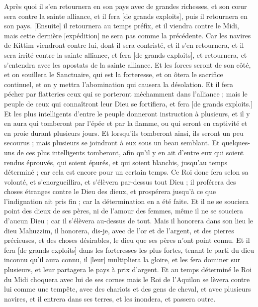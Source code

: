 \begin{multicols}{2}
Après quoi il s'en retournera en son pays avec de grandes richesses, et son cœur sera contre la sainte alliance, et il fera [de grands exploits], puis il retournera en son pays.
[Ensuite] il retournera au temps préfix, et il viendra contre le Midi, mais cette dernière [expédition] ne sera pas comme la précédente.
Car les navires de Kittim viendront contre lui, dont il sera contristé, et il s'en retournera, et il sera irrité contre la sainte alliance, et fera [de grands exploits], et retournera, et s'entendra avec les apostats de la sainte alliance.
Et les forces seront de son côté, et on souillera le Sanctuaire, qui est la forteresse, et on ôtera le sacrifice continuel, et on y mettra l'abomination qui causera la désolation.
Et il fera pécher par flatteries ceux qui se porteront méchamment dans l'alliance ; mais le peuple de ceux qui connaîtront leur Dieu se fortifiera, et fera [de grands exploits.]
Et les plus intelligents d'entre le peuple donneront instruction à plusieurs, et il y en aura qui tomberont par l'épée et par la flamme, ou qui seront en captivité et en proie durant plusieurs jours.
Et lorsqu'ils tomberont ainsi, ils seront un peu secourus ; mais plusieurs se joindront à eux sous un beau semblant.
Et quelques-uns de ces plus intelligents tomberont, afin qu'il y en ait d'entre eux qui soient rendus éprouvés, qui soient épurés, et qui soient blanchis, jusqu'au temps déterminé ; car cela est encore pour un certain temps.
Ce Roi donc fera selon sa volonté, et s'enorgueillira, et s'élèvera par-dessus tout Dieu ; il proférera des choses étranges contre le Dieu des dieux, et prospérera jusqu'à ce que l'indignation ait pris fin ; car la détermination en a été faite.
Et il ne se souciera point des dieux de ses pères, ni de l'amour des femmes, même il ne se souciera d'aucun Dieu ; car il s'élèvera au-dessus de tout.
Mais il honorera dans son lieu le dieu Mahuzzim, il honorera, dis-je, avec de l'or et de l'argent, et des pierres précieuses, et des choses désirables, le dieu que ses pères n'ont point connu.
Et il fera [de grands exploits] dans les forteresses les plus fortes, tenant le parti du dieu inconnu qu'il aura connu, il [leur] multipliera la gloire, et les fera dominer sur plusieurs, et leur partagera le pays à prix d'argent.
Et au temps déterminé le Roi du Midi choquera avec lui de ses cornes mais le Roi de l'Aquilon se lèvera contre lui comme une tempête, avec des chariots et des gens de cheval, et avec plusieurs navires, et il entrera dans ses terres, et les inondera, et passera outre.

\end{multicols}

